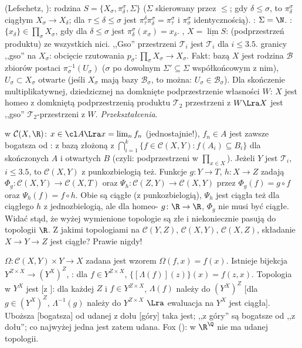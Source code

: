   (Lefschetz, ): rodzina $S = \{X_\sigma, \pi_\delta^\sigma, \Sigma\}$ ($\Sigma$ skierowany przez $\le$; gdy $\delta \le \sigma$, to $\pi_\delta^\sigma$ ciągłym $X_\sigma \to X_\delta$; dla $\tau \le \delta \le \sigma$ jest $\pi_\tau^\delta \pi_\delta^\sigma = \pi_\tau^\sigma$ i $\pi_\sigma^\sigma$ identycznością).
: $\Sigma = \N$.
: $\{x_\delta\} \in \prod_\sigma X_\sigma$, gdy dla $\delta \le \sigma$ jest $\pi_\delta^\sigma(x_\sigma) = x_\delta$.
, $X = \underline{\lim} S$: (podprzestrzeń produktu) ze wszystkich nici.
,,Gso'' przestrzeni $\mathcal T_i$ jest $\mathcal T_i$ dla $i \le 3.5$.
  granicy ,,gso'' na $X_\sigma$: obcięcie rzutowania $p_\sigma \colon \prod_\sigma X_\sigma \to X_\sigma$.
Fakt: bazą $X$ jest rodzina $\mathcal B$ zbiorów postaci $\pi_\sigma^{-1}(U_\sigma)$ ($\sigma$ po dowolnym $\Sigma' \subseteq \Sigma$ współkońcowym z nim), $U_\sigma \subset X_\sigma$ otwarte (jeśli $X_\sigma$ mają bazy $\mathcal B_\sigma$, to można: $U_\sigma \in \mathcal B_\sigma$).
Dla skończenie multiplikatywnej, dziedzicznej na domknięte podprzestrzenie własności $W$: $X$ jest homeo z domkniętą podprzestrzenią produktu $\mathcal T_2$ przestrzeni z $W \Lra X$ jest ,,gso'' $\mathcal T_2$-przestrzeni z $W$.
\emph{Przekształcenia}.

  w $\mathcal C(X, \R)$: $x \in \cl A \Lra x = \lim_n f_n$ (jednostajnie!), $f_n \in A$ jest zawsze bogatsza od : z bazą złożoną z $\bigcap_{i=1}^k \{f \in \mathcal C(X, Y) : f(A_i) \subseteq B_i\}$ dla skończonych $A$ i otwartych $B$ (czyli: podprzestrzeni w $\prod_{x \in X}$).
Jeżeli $Y$ jest $\mathcal T_i$, $i \le 3.5$, to $\mathcal C(X, Y)$ z punkozbielogią też.
Funkcje $g \colon Y \to T$, $h \colon X \to Z$ zadają $\Phi_g \colon \mathcal C(X, Y) \to \mathcal C(X,T)$ oraz $\Psi_h \colon \mathcal C(Z, Y) \to \mathcal C(X, Y)$ przez $\Phi_g(f) = g \circ f$ oraz $\Psi_h(f) = f \circ h$.
Obie są ciągłe (z punkozbielogią), $\Psi_h$ jest ciągła też dla ciągłego $h$ z jednozbielogią, ale dla homeo- $g \colon \R \to \R$, $\Phi_g$ nie musi być ciągłe.
Widać stąd, że wyżej wymienione topologie są złe i niekoniecznie pasują do topologii $\R$.
Z jakimi topologiami na $\mathcal C(Y, Z)$, $\mathcal C(X, Y)$, $\mathcal C(X,Z)$, składanie $X \to Y \to Z$ jest ciągłe? Prawie nigdy!

 $\Omega \colon \mathcal C(X, Y) \times Y \to X$ zadana jest wzorem $\Omega(f,x) = f(x)$.
Istnieje bijekcja $Y^{Z \times X} \to (Y^X)^Z$, : dla $f \in Y^{Z \times  X}$, $\{[\Lambda(f)](z)\}(x) = f(z,x)$.
Topologia w $Y^X$ jest  [z ]: dla każdej $Z$ i $f \in Y^{Z \times X}$, $\Lambda(f)$ należy do $(Y^X)^Z$ [dla $g \in (Y^X)^Z$, $\Lambda^{-1}(g)$ należy do $Y^{Z \times X}$ $\Lra$ ewaluacja na $Y^X$ jest ciągła].
Uboższa [bogatsza] od udanej z dołu [góry] taka jest; ,,z góry'' są bogatsze od ,,z dołu''; co najwyżej jedna jest zatem udana.
Fox (): w $\R^\Q$ nie ma udanej topologii.

